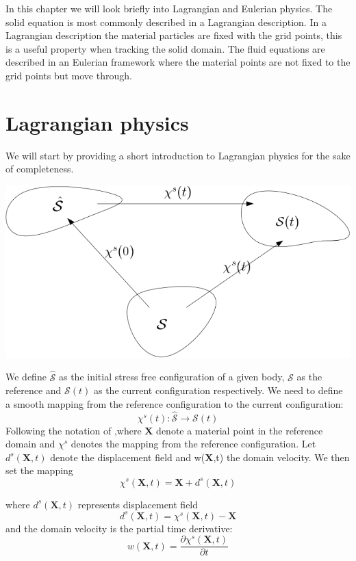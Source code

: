 \newpage
In this chapter we will look briefly into Lagrangian and Eulerian physics. The solid equation is most commonly described in a Lagrangian description. In a Lagrangian description the material particles are fixed with the grid points, this is a useful property when tracking the solid domain. The fluid equations are described in an Eulerian framework where the material points are not fixed to the grid points but move through.

\section{Lagrangian physics}
We will start by providing a short introduction to Lagrangian physics for the sake of completeness.
\begin{center}
\includegraphics[scale=0.4]{continuum_mapping.png}
\end{center}
We define $ \hat{\mathcal{S}}$ as the initial stress free configuration of a given body, $\mathcal{S}$ as the reference and $\mathcal{S}(t)$ as the current configuration respectively.
We need to define a smooth mapping from the reference configuration to the current configuration:
\begin{equation}
\chi^s(t) : \hat{\mathcal{S}} \rightarrow \mathcal{S}(t)     
\end{equation}
Following the notation of \cite{Holzapfel2000},where $\textbf{X}$ denote a material point in the reference domain and $\chi^s$ denotes the mapping from the reference configuration. 
Let $d^s(\textbf{X},t)$ denote the displacement field and w(\textbf{X},t) the domain velocity. We then set the mapping
\begin{equation}
 \chi^s(\textbf{X},t) = \textbf{X}  + d^s(\textbf{X} ,t) 
\end{equation}

where $d^s(\textbf{X} ,t)$ represents displacement field
\begin{equation}
 d^s(\textbf{X},t) = \chi^s(\textbf{X},t) -\textbf{X}   
\end{equation}
and the domain velocity is the partial time derivative: 
\begin{equation}
 w(\textbf{X},t) = \frac{\partial \chi^s(\textbf{X},t)}{\partial t}   
\end{equation}

